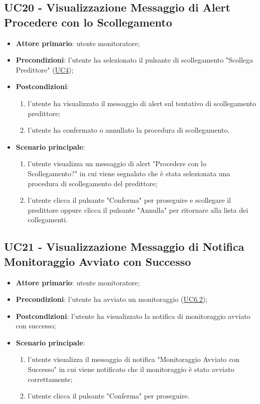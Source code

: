 	\subsection{UC20 - Visualizzazione Messaggio di Alert Procedere con lo Scollegamento}
		\begin{itemize}
			\item\textbf{Attore primario}: utente monitoratore;
			\item\textbf{Precondizioni}: l’utente ha selezionato il pulsante di scollegamento "Scollega Predittore" (\hyperref[par:UC4]{UC4});
			\item\textbf{Postcondizioni}:
				\begin{enumerate}
					\item l'utente ha visualizzato il messaggio di alert sul tentativo di scollegamento predittore;
					\item l'utente ha confermato o annullato la procedura di scollegamento. 
				\end{enumerate}
			\item\textbf{Scenario principale}: 
				\begin{enumerate} 
					\item l’utente visualizza un messaggio di alert "Procedere con lo Scollegamento?" in cui viene segnalato che è stata selezionata una procedura di scollegamento del predittore;
					\item l'utente clicca il pulsante "Conferma" per proseguire e scollegare il predittore oppure clicca il pulsante "Annulla" per ritornare alla lista dei collegamenti.
				\end{enumerate}
		\end{itemize}	


	\label{par:UC21}
	\subsection{UC21 - Visualizzazione Messaggio di Notifica Monitoraggio Avviato con Successo}	
		\begin{itemize}
			\item\textbf{Attore primario}: utente monitoratore;
			\item\textbf{Precondizioni}: l’utente ha avviato un monitoraggio (\hyperref[par:UC6.2]{UC6.2});
			\item\textbf{Postcondizioni}: l’utente ha visualizzato la notifica di monitoraggio avviato con successo; 
			\item\textbf{Scenario principale}: 
				\begin{enumerate} 
					\item l’utente visualizza il messaggio di notifica "Monitoraggio Avviato con Successo" in cui viene notificato che il monitoraggio è stato avviato correttamente;
					\item l'utente clicca il pulsante "Conferma" per proseguire.		
				\end{enumerate}		
		\end{itemize}

